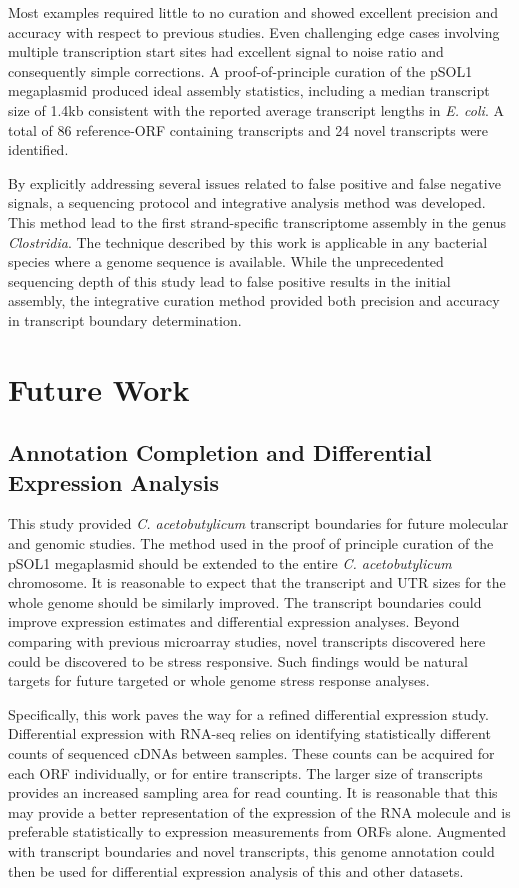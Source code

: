 Most examples required little to no curation and showed excellent precision and accuracy with respect to previous studies. Even challenging edge cases involving multiple transcription start sites had excellent signal to noise ratio and consequently simple corrections. A proof-of-principle curation of the pSOL1 megaplasmid produced ideal assembly statistics, including a median transcript size of 1.4kb consistent with the reported average transcript lengths in \textit{E. coli}. A total of 86 reference-ORF containing transcripts and 24 novel transcripts were identified.

By explicitly addressing several issues related to false positive and false negative signals, a sequencing protocol and integrative analysis method was developed. This method lead to the first strand-specific transcriptome assembly in the genus \textit{Clostridia}. The technique described by this work is applicable in any bacterial species where a genome sequence is available. While the unprecedented sequencing depth of this study lead to false positive results in the initial assembly, the integrative curation method provided both precision and accuracy in transcript boundary determination. 

\chapter{Future Work}
\section{Annotation Completion and Differential Expression Analysis}
This study provided \textit{C. acetobutylicum} transcript boundaries for future molecular and genomic studies. The method used in the proof of principle curation of the pSOL1 megaplasmid should be extended to the entire \textit{C. acetobutylicum} chromosome. It is reasonable to expect that the transcript and UTR sizes for the whole genome should be similarly improved. The transcript boundaries could improve expression estimates and differential expression analyses. Beyond comparing with previous microarray studies, novel transcripts discovered here could be discovered to be stress responsive. Such findings would be natural targets for future targeted or whole genome stress response analyses. 

Specifically, this work paves the way for a refined differential expression study. Differential expression with RNA-seq relies on identifying statistically different counts of sequenced cDNAs between samples.\cite{53} These counts can be acquired for each ORF individually, or for entire transcripts. The larger size of transcripts provides an increased sampling area for read counting. It is reasonable that this may provide a better representation of the expression of the RNA molecule and is preferable statistically to expression measurements from ORFs alone. Augmented with transcript boundaries and novel transcripts, this genome annotation could then be used for differential expression analysis of this and other datasets.


